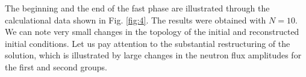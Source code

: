 \documentclass[a4paper]{jpconf}
\begin{document}
The beginning and the end of the fast phase are illustrated through the calculational data shown in Fig. \ref{fig:4}. The results were obtained with $N=10$. We can note very small changes in the topology of the initial and reconstructed initial conditions. Let us pay attention to the substantial restructuring of the solution, which is illustrated by large changes in the neutron flux amplitudes for the first and second groups.

\begin{figure}[!h]
  \begin{center}
\begin{minipage}{0.051\linewidth}
 \\
\end{minipage}
\hfill
\begin{minipage}{0.3\linewidth}
 \\
\end{minipage}
\hfill
\begin{minipage}{0.3\linewidth}
 \\

\end{minipage}
\end{center}
\end{figure}
\end{document}

